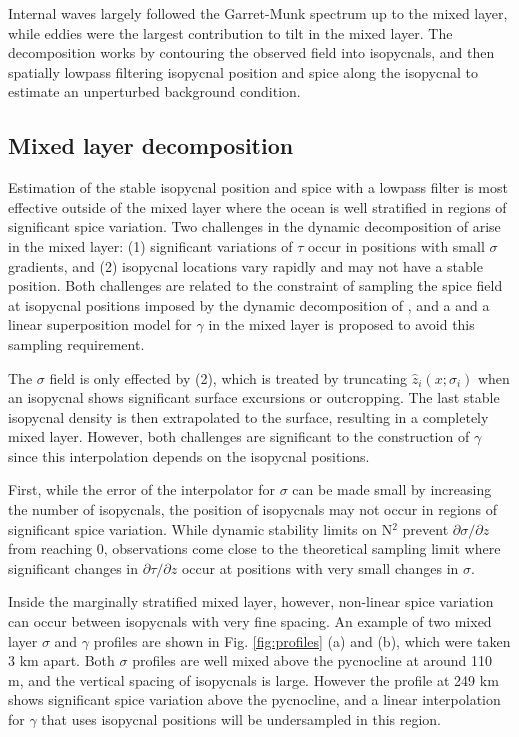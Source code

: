 \documentclass[preprint,NumberedRefs]{JASA}
\begin{document}
Internal waves largely followed the Garret-Munk spectrum up to the mixed layer, while eddies were the largest contribution to tilt in the mixed layer.  The decomposition works by contouring the observed field into isopycnals, and then spatially lowpass filtering isopycnal position and spice along the isopycnal to estimate an unperturbed background condition.

\subsection{Mixed layer decomposition}
Estimation of the stable isopycnal position and spice with a lowpass filter is most effective outside of the mixed layer where the ocean is well stratified in regions of significant spice variation. Two challenges in the dynamic decomposition of \citep{dzieciuch2004} arise in the mixed layer: (1) significant variations of $\tau$ occur in positions with small $\sigma$ gradients, and (2) isopycnal locations vary rapidly and may not have a stable position. Both challenges are related to the constraint of sampling the spice field at isopycnal positions imposed by the dynamic decomposition of \citep{dzieciuch2004}, and a and a linear superposition model for $\gamma$ in the mixed layer is proposed to avoid this sampling requirement.

The $\sigma$ field is only effected by (2), which is treated by truncating $\hat{z}_i(x; \sigma_i)$ when an isopycnal shows significant surface excursions or outcropping. The last stable isopycnal density is then extrapolated to the surface, resulting in a completely mixed layer. However, both challenges are significant to the construction of $\gamma$ since this interpolation depends on the isopycnal positions.



First, while the error of the interpolator for $\sigma$ can be made small by increasing the number of isopycnals, the position of isopycnals may not occur in regions of significant spice variation. While dynamic stability limits on N$^2$ prevent $\partial \sigma / \partial z$ from reaching 0, observations come close to the theoretical sampling limit where significant changes in $\partial \tau / \partial z$ occur at positions with very small changes in $\sigma$.

 Inside the marginally stratified mixed layer, however, non-linear spice variation can occur between isopycnals with very fine spacing. An example of two mixed layer $\sigma$ and $\gamma$ profiles are shown in Fig. \ref{fig:profiles} (a) and (b), which were taken 3 km apart. Both $\sigma$ profiles are well mixed above the pycnocline at around 110 m, and the vertical spacing of isopycnals is large. However the profile at 249 km shows significant spice variation above the pycnocline, and a linear interpolation for $\gamma$ that uses isopycnal positions will be undersampled in this region.
\end{document}
